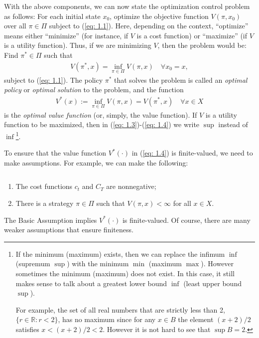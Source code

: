 \documentclass[\topdir/lecture\_notes.tex]{subfiles}
\begin{document}
With the above components, we can now state the optimization control problem as follows: For each initial state $x_{0}$, optimize the objective function $V(\pi, x_{0})$ over all $\pi \in \Pi$ subject to (\ref{eq: 1.1}). Here, depending on the context, ``optimize'' means either ``minimize'' (for instance, if $V$ is a cost function) or ``maximize'' (if $V$ is a utility function). Thus, if we are minimizing $V$, then the problem would be: Find $\pi^{*} \in \Pi$ such that
\begin{align}
V(\pi^{*}, x)=\inf_{\pi \in \Pi} V(\pi, x) \quad \forall x_{0}=x, \label{eq: 1.3}
\end{align}
subject to (\ref{eq: 1.1}). The policy $\pi^{*}$ that solves the problem is called an \emph{optimal policy} or \emph{optimal solution} to the problem, and the function
\begin{align}
V^{*}(x):=\inf _{\pi \in \Pi} V(\pi, x)=V(\pi^{*}, x) \quad \forall x \in X \label{eq: 1.4}
\end{align}
is the \emph{optimal value function} (or, simply, the value function). If $V$ is a utility function to be maximized, then in (\ref{eq: 1.3})-(\ref{eq: 1.4}) we write $\sup$ instead of $\inf$\footnote{If the minimum (maximum) exists, then we can replace the infimum $\inf$ (supremum $\sup$) with the minimum $\min$ (maximum $\max$). However sometimes the minimum (maximum) does not exist. In this case, it still makes sense to talk about a greatest lower bound $\inf$ (least upper bound  $\sup$).

For example, the set of all real numbers that are strictly less than 2, $ \{r \in \mathbb{R}: r<2\} $, has no maximum since for any $x \in B$ the element $(x+2)/2$ satisfies $x<(x+2)/2<2$. However it is not hard to see that $\sup B=2$.}.

To ensure that the value function $V^{*}(\cdot)$ in (\ref{eq: 1.4}) is finite-valued, we need to make assumptions. For example, we can make the following: \begin{assumption}
$ $
\begin{enumerate}[label=(\alph*)]
    \item \label{item: basic_a}The cost functions $c_{t}$ and $C_{T}$ are nonnegative;
    \item \label{item: basic_b}There is a strategy $\pi \in \Pi$ such that $V(\pi, x)<\infty$ for all $x \in X$.
\end{enumerate}
\end{assumption}
The Basic Assumption implies $V^{*}(\cdot)$ is finite-valued. Of course, there are many weaker assumptions that ensure finiteness.
\end{document}
